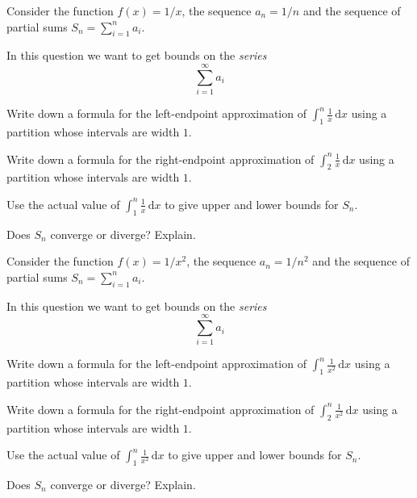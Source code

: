 \documentclass{workbook}
\begin{document}
\begin{slide}
	\question
	Consider the function $f(x)=1/x$, the sequence $a_n=1/n$ and 
	the sequence of partial sums $\displaystyle S_n = \sum_{i=1}^n a_i$.

	In this question we want to get bounds on the \emph{series}
	\[
		\sum_{i=1}^\infty a_i
	\]
	\begin{parts}
		\item Write down a formula for the left-endpoint approximation of
		$\displaystyle \int_1^n \frac{1}{x}\,\mathrm d x$ using a partition
		whose intervals are width $1$.

		\bigskip
		\bigskip
		\bigskip
		\item Write down a formula for the right-endpoint approximation of
		$\displaystyle \int_2^n \frac{1}{x}\,\mathrm d x$ using a partition
		whose intervals are width $1$.
		\item Use the actual value of $\displaystyle \int_1^n \frac{1}{x}\,\mathrm d x$ to give upper and lower bounds for $S_n$.
		\item Does $S_n$ converge or diverge? Explain.
	\end{parts}
\end{slide}

\begin{slide}
	\question
	Consider the function $f(x)=1/x^2$, the sequence $a_n=1/n^2$ and 
	the sequence of partial sums $\displaystyle S_n = \sum_{i=1}^n a_i$.

	In this question we want to get bounds on the \emph{series}
	\[
		\sum_{i=1}^\infty a_i
	\]
	\begin{parts}
		\item Write down a formula for the left-endpoint approximation of
		$\displaystyle \int_1^n \frac{1}{x^2}\,\mathrm d x$ using a partition
		whose intervals are width $1$.
		
		\bigskip
		\bigskip
		\bigskip
		\item Write down a formula for the right-endpoint approximation of
		$\displaystyle \int_2^n \frac{1}{x^2}\,\mathrm d x$ using a partition
		whose intervals are width $1$.
		\item Use the actual value of $\displaystyle \int_1^n \frac{1}{x^2}\,\mathrm d x$ to give upper and lower bounds for $S_n$.
		\item Does $S_n$ converge or diverge? Explain.
	\end{parts}
\end{slide}
\end{document}
